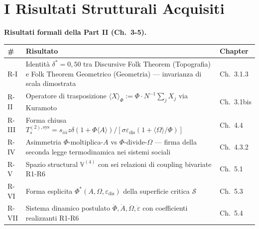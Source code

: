 \section{I Risultati Strutturali
Acquisiti}\label{i-risultati-strutturali-acquisiti}

\Proved{} \textbf{Risultati formali della Part II (Ch.~3-5).}

{\def\LTcaptype{none} %
{\small\begin{longtable}[]{@{}
  >{\raggedright\arraybackslash}p{}
  >{\raggedright\arraybackslash}p{}
  >{\raggedright\arraybackslash}p{}@{}}
\toprule\noalign{}
\begin{minipage}[b]{\linewidth}\raggedright
\#
\end{minipage} & \begin{minipage}[b]{\linewidth}\raggedright
Risultato
\end{minipage} & \begin{minipage}[b]{\linewidth}\raggedright
Chapter
\end{minipage} \\
\midrule\noalign{}
\endhead
\bottomrule\noalign{}
\endlastfoot
R-I & Identità \(\delta^* = 0{,}50\) tra Discursive Folk Theorem
(Topografia) e Folk Theorem Geometrico (Geometria) --- invarianza di
scala dimostrata & Ch.~3.1.3 \\
R-II & Operatore di trasposizione
\(\langle X \rangle_\Phi := \Phi \cdot N^{-1}\sum_j X_j\) via Kuramoto &
Ch.~3.1bis \\
R-III & Forma chiusa
\(T_s^{(2),\text{sys}} = s_{iii} z \delta (1+\Phi\langle A\rangle) / [\sigma \varepsilon_{\text{dis}} (1 + \langle\Omega\rangle/\Phi)]\)
& Ch.~4.4 \\
R-IV & Asimmetria \(\Phi\)-moltiplica-\(A\) vs
\(\Phi\)-divide-\(\Omega\) --- firma della seconda legge termodinamica
nei sistemi sociali & Ch.~4.3.2 \\
R-V & Spazio structural \(\mathbb{V}^{(4)}\) con sei relazioni di
coupling bivariate R1-R6 & Ch.~5.1 \\
R-VI & Forma esplicita \(\Phi^*(A, \Omega, \varepsilon_{\text{dis}})\)
della superficie critica \(\mathcal{S}\) & Ch.~5.3 \\
R-VII & Sistema dinamico postulato
\(\dot\Phi, \dot A, \dot\Omega, \dot\varepsilon\) con coefficienti
realizzanti R1-R6 & Ch.~5.4 \\
\end{longtable}}
}

